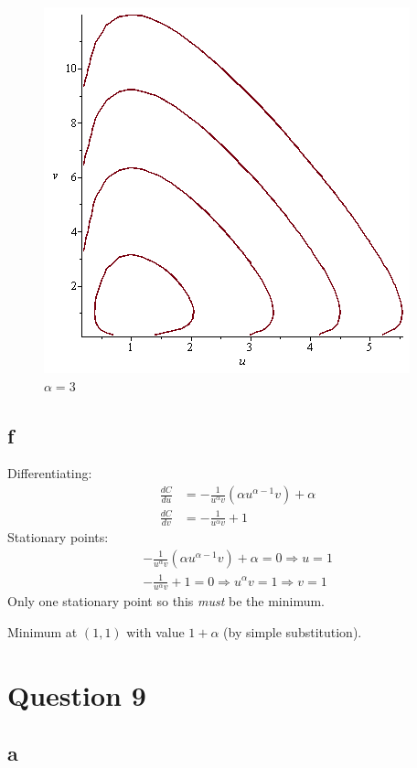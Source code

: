 \documentclass{unswmaths}
\begin{document}
\begin{figure}[H]
    \includegraphics[scale=0.5]{orbits_3}
    \caption{$\alpha = 3$}
\end{figure}
\subsection*{f}
    Differentiating:
    \begin{align*}
        \frac{dC}{du} &= -\frac{1}{u^\alpha v} ( \alpha u^{\alpha-1} v ) + \alpha \\
        \frac{dC}{dv} &= -\frac{1}{u^\alpha v} + 1
    \end{align*}
    Stationary points:
    \begin{align*}
        -\frac{1}{u^\alpha v} ( \alpha u^{\alpha-1} v ) + \alpha = 0 \Longrightarrow u = 1 \\
        -\frac{1}{u^\alpha v} + 1 = 0 \Longrightarrow u^\alpha v = 1 \Longrightarrow v = 1
    \end{align*}
    Only one stationary point so this \emph{must} be the minimum. 
    
    Minimum at $ (1,1) $ with value $ 1 + \alpha $ (by simple substitution).
\section*{Question 9}
\subsection*{a}
\begin{figure}[H]
\end{figure}
\end{document}

